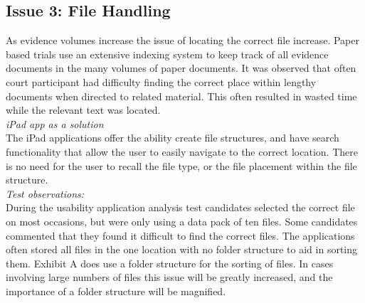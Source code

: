 \documentclass{article}
\begin{document}
\subsection{Issue 3: File Handling}
As evidence volumes increase the issue of locating the correct file increase. Paper based trials use an extensive indexing system to keep track of all evidence documents in the many volumes of paper documents. It was observed that often court participant had difficulty finding the correct place within lengthy documents when directed to related material. This often resulted in wasted time while the relevant text was located.\\
\textit{iPad app as a solution}\\
The iPad applications offer the ability create file structures, and have search functionality that allow the user to easily navigate to the correct location. There is no need for the user to recall the file type, or the file placement within the file structure.
\\
\textit{Test observations:}\\
During the usability application analysis test candidates selected the correct file on most occasions, but were only using a data pack of ten files. Some candidates commented that they found it difficult to find the correct files. The applications often stored all files in the one location with no folder structure to aid in sorting them. Exhibit A does use a folder structure for the sorting of files. In cases involving large numbers of files this issue will be greatly increased, and the importance of a folder structure will be magnified.\\
\end{document}
